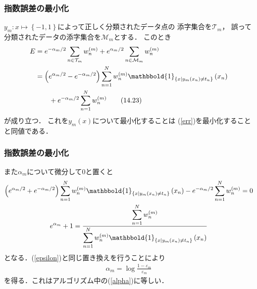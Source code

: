 \documentclass[10pt,hyperref={unicode}]{beamer}
\newcommand{\pref}[1]{{\fontfamily{lmr}\selectfont (\ref{#1})}}
\newcommand{\parentheses}[1]{\left(#1\right)}
\newcommand{\braces}[1]{\left\{#1\right\}}
\begin{document}
\begin{frame}
\frametitle{指数誤差の最小化}
$y_m: x \mapsto \braces{-1,1}$によって正しく分類されたデータ点の
添字集合を$\mathcal{T}_m$，
誤って分類されたデータの添字集合を$\mathcal{M}_m$とする．
このとき
\begin{align}
    E
    &= e^{-\alpha_m/2}\sum_{n \in \mathcal{T}_m} w_n^{\parentheses{m}} + e^{\alpha_m/2}\sum_{n \in \mathcal{M}_m}w_n^{\parentheses{m}} \notag \\
    &= \parentheses{e^{\alpha_m/2} - e^{-\alpha_m/2}}\sum_{n = 1}^N w_n^{\parentheses{m}}\mathbbold{1}_{\braces{x | y_m\parentheses{x_n} \neq t_n}}\parentheses{x_n} \notag \\
    &\qquad + e^{-\alpha_m/2}\sum_{n = 1}^N w_n^{\parentheses{m}}
    \tag{14.23}
\end{align}
が成り立つ．
これを$y_m\parentheses{x}$について最小化することは
\pref{err}を最小化することと同値である．
\end{frame}

\begin{frame}
\frametitle{指数誤差の最小化}
また$\alpha_m$について微分して$0$と置くと
\begin{gather*}
    \parentheses{e^{\alpha_m/2} + e^{-\alpha_m/2}}\sum_{n = 1}^N w_n^{\parentheses{m}}\mathbbold{1}_{\braces{x | y_m\parentheses{x_n} \neq t_n}}\parentheses{x_n}
    - e^{-\alpha_m/2}\sum_{n = 1}^N w_n^{\parentheses{m}} = 0 \\
    e^{\alpha_m} + 1
    = \frac{\displaystyle \sum_{n = 1}^N w_n^{\parentheses{m}}}{\displaystyle \sum_{n = 1}^N w_n^{\parentheses{m}}\mathbbold{1}_{\braces{x | y_m\parentheses{x_n} \neq t_n}}\parentheses{x_n}}
\end{gather*}
となる．\pref{epsilon}と同じ置き換えを行うことにより
\begin{gather*}
    \alpha_m = \log \frac{1 - \varepsilon_m}{\varepsilon_m}
\end{gather*}
を得る．これはアルゴリズム中の\pref{alpha}に等しい．
\end{frame}
\end{document}
